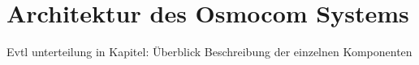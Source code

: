 \section{Architektur des Osmocom Systems}
Evtl unterteilung in Kapitel:
Überblick
Beschreibung der einzelnen Komponenten